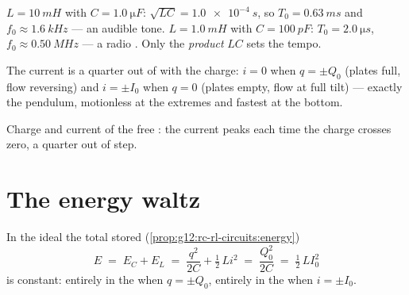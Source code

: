 \begin{example}\label{ex:g12:rlc-oscillations:firstnumbers}
$L = \qty{10}{mH}$ with $C = \qty{1.0}{\micro F}$:
$\sqrt{LC} = \qty{1.0e-4}{s}$, so $T_0 = \qty{0.63}{ms}$ and
$f_0 \approx \qty{1.6}{kHz}$ --- an audible tone. $L = \qty{1.0}{mH}$
with $C = \qty{100}{pF}$: $T_0 = \qty{2.0}{\micro s}$,
$f_0 \approx \qty{0.50}{MHz}$ --- a radio . Only the
\emph{product} $LC$ sets the tempo.
\end{example}

\begin{remark}\label{rem:g12:rlc-oscillations:quarter}
The current is a quarter  out of  with the charge: $i = 0$
when $q = \pm Q_0$ (plates full, flow reversing) and $i = \pm I_0$
when $q = 0$ (plates empty, flow at full tilt) --- exactly the
pendulum, motionless at the extremes and fastest at the bottom.
\end{remark}

\begin{omfigure}

{\small Charge and current of the free : the current peaks
each time the charge crosses zero, a quarter  out of step.}
\end{omfigure}

\section{The energy waltz}

\begin{proposition}\label{prop:g12:rlc-oscillations:energy}
In the ideal  the total stored 
(\cref{prop:g12:rc-rl-circuits:energy})
\[
E \;=\; E_C + E_L \;=\; \frac{q^2}{2C} + \tfrac12\,L i^2
\;=\; \frac{Q_0^2}{2C} \;=\; \tfrac12\,L I_0^2
\]
is constant: entirely in the  when $q = \pm Q_0$, entirely in
the  when $i = \pm I_0$.
\end{proposition}

